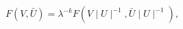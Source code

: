 \begin{equation}
F(V, \bar{U}) = \lambda^{-k} F(V\mid U\mid^{-1}, \bar{U} \mid U\mid^{-1}),
\end{equation}

